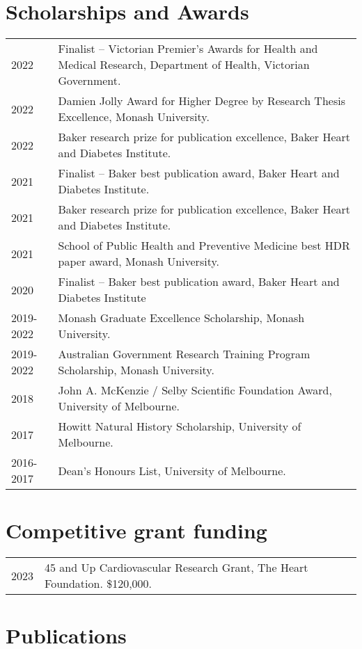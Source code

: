 \documentclass[11pt]{article}
\begin{document}
\section*{Scholarships and Awards}
\begin{tabular}{p{2cm}p{14cm}}
2022 & Finalist – Victorian Premier's Awards for Health and Medical Research, Department of Health, Victorian Government. \\
2022 & Damien Jolly Award for Higher Degree by Research Thesis Excellence, Monash University. \\
2022 & Baker research prize for publication excellence, Baker Heart and Diabetes Institute. \\
2021 & Finalist – Baker best publication award, Baker Heart and Diabetes Institute. \\
2021 & Baker research prize for publication excellence, Baker Heart and Diabetes Institute. \\
2021 & School of Public Health and Preventive Medicine best HDR paper award, Monash University. \\
2020 & Finalist – Baker best publication award, Baker Heart and Diabetes Institute \\
2019-2022 & Monash Graduate Excellence Scholarship, Monash University. \\
2019-2022 & Australian Government Research Training Program Scholarship, Monash University. \\
2018 & John A. McKenzie / Selby Scientific Foundation Award, University of Melbourne. \\
2017 & Howitt Natural History Scholarship, University of Melbourne. \\
2016-2017 & Dean's Honours List, University of Melbourne. \\
\end{tabular}

\section*{Competitive grant funding}
\begin{tabular}{p{2cm}p{14cm}}
2023 & 45 and Up Cardiovascular Research Grant, The Heart Foundation. \$120,000. \\
\end{tabular}

\clearpage
\section*{Publications}

\clearpage
\end{document}

